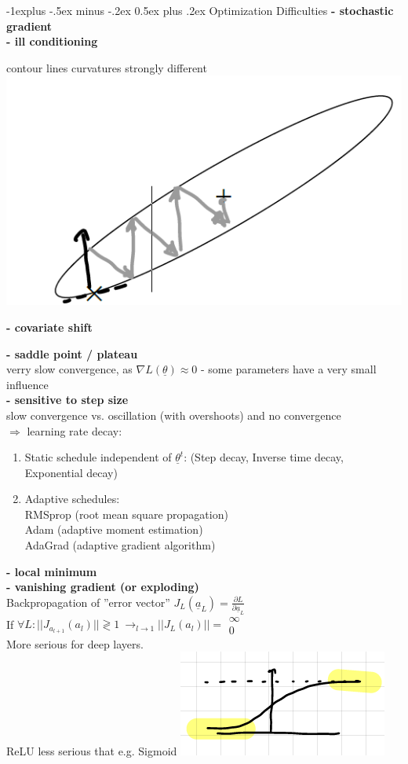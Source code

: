 \documentclass[a4paper,10pt,landscape]{article}
\makeatletter
\renewcommand{\subsection}{\@startsection{subsection}{2}{0mm}%
                                {-1explus -.5ex minus -.2ex}%
                                {0.5ex plus .2ex}%
                                {\normalfont\normalsize\bfseries}}
\newcommand{\utheta}{\underline{\theta}}
\makeatother
\begin{document}
\begin{multicols*}{3}
    \subsection{Optimization Difficulties}
    \textbf{- stochastic gradient}\\
    \textbf{- ill conditioning}\\
    \begin{multicols*}{2}
         contour lines curvatures strongly different\\
        \columnbreak
        \includegraphics[width=0.5\linewidth]{Graphics/ill-conditioning.png}
    \end{multicols*}
    \textbf{- covariate shift}
    
    \textbf{- saddle point / plateau}\\
    verry slow convergence, as $\nabla L(\utheta) \approx 0$ - 
    some parameters have a very small influence\\
    \textbf{- sensitive to step size}\\
    slow convergence vs. oscillation (with overshoots) and no convergence\\
    $\Rightarrow$ learning rate decay:
    \begin{enumerate}
        \item Static schedule independent of $\utheta^t$:  (Step decay, Inverse time decay, Exponential decay)
        \item Adaptive schedules: \\
            RMSprop (root mean square propagation)\\
            Adam (adaptive moment estimation) \\
            AdaGrad (adaptive gradient algorithm)
    \end{enumerate}
    \textbf{- local minimum}\\
    \textbf{- vanishing gradient (or exploding)}\\
    Backpropagation of ''error vector'' $J_L(\underline{a}_L) = \frac{\partial L}{\partial \underline{a}_L}$ \\
    If $\forall L: ||J_{a_{l+1}}(a_l) || \gtrless 1 \ \rightarrow_{l\rightarrow 1} ||J_L(a_l) || = \begin{matrix} \infty \\ 0 \end{matrix} $ \\
    More serious for deep layers.\\
    ReLU less serious that e.g. Sigmoid 
    \includegraphics[width=0.25\linewidth]{Graphics/sigmoid.png}    


\end{multicols*}
\end{document}
